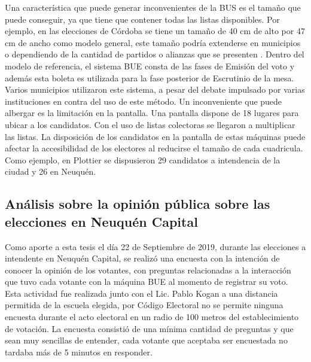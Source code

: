 Una característica que puede generar inconvenientes de la BUS es el tamaño que puede conseguir, ya que tiene que contener todas las listas disponibles. Por ejemplo, en las elecciones de Córdoba se tiene un tamaño de 40 cm de alto por 47 cm de ancho como modelo general, este tamaño podría extenderse en municipios o dependiendo de la cantidad de partidos o alianzas que se presenten \cite{boletaUnicaTamanio}. \newline
Dentro del modelo de referencia, el sistema BUE consta de las fases de Emisión del voto y además esta boleta es utilizada para la fase posterior de Escrutinio de la mesa. Varios municipios utilizaron este sistema, a pesar del debate impulsado por varias instituciones en contra del uso de este método. Un inconveniente que puede albergar es la limitación en la pantalla. Una pantalla dispone de 18 lugares para ubicar a los candidatos. Con el uso de listas colectoras se llegaron a multiplicar las listas. La disposición de los candidatos en la pantalla de estas máquinas puede afectar la accesibilidad de los electores al reducirse el tamaño de cada cuadricula. Como ejemplo, en Plottier \cite{lmncolectoras} se dispusieron 29 candidatos a intendencia de la ciudad y 26 en Neuquén. 
\subsection{Análisis sobre la opinión pública sobre las elecciones en Neuquén Capital}
\label{encuesta}

Como aporte a esta tesis el día 22 de Septiembre de 2019, durante las elecciones a intendente en Neuquén Capital, se realizó una encuesta con la intención de conocer la opinión de los votantes, con preguntas relacionadas a la interacción que tuvo cada votante con la máquina BUE al momento de registrar su voto. Esta actividad fue realizada junto con el Lic. Pablo Kogan a una distancia permitida de la escuela elegida, por Código Electoral no se permite ninguna encuesta durante el acto electoral en un radio de 100 metros del establecimiento de votación. La encuesta consistió de una mínima cantidad de preguntas y que sean muy sencillas de entender, cada votante que aceptaba ser encuestada no tardaba más de 5 minutos en responder.

